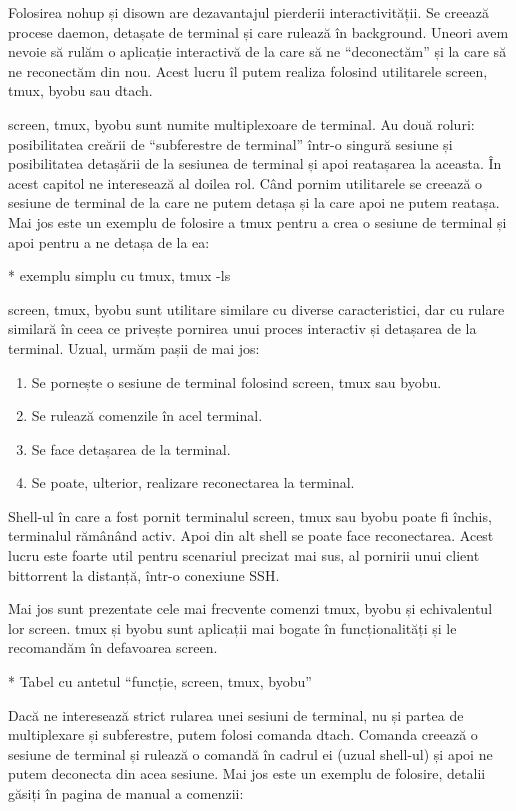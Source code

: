 Folosirea nohup și disown are dezavantajul pierderii interactivității. Se
creează procese daemon, detașate de terminal și care rulează în background.
Uneori avem nevoie să rulăm o aplicație interactivă de la care să ne
“deconectăm” și la care să ne reconectăm din nou. Acest lucru îl putem realiza
folosind utilitarele screen, tmux, byobu sau dtach.

screen, tmux, byobu sunt numite multiplexoare de terminal. Au două roluri:
posibilitatea creării de “subferestre de terminal” într-o singură sesiune și
posibilitatea detașării de la sesiunea de terminal și apoi reatașarea la
aceasta. În acest capitol ne interesează al doilea rol. Când pornim utilitarele
se creează o sesiune de terminal de la care ne putem detașa și la care apoi ne
putem reatașa. Mai jos este un exemplu de folosire a tmux pentru a crea o
sesiune de terminal și apoi pentru a ne detașa de la ea:

* exemplu simplu cu tmux, tmux -ls

screen, tmux, byobu sunt utilitare similare cu diverse caracteristici, dar cu
rulare similară în ceea ce privește pornirea unui proces interactiv și detașarea
de la terminal. Uzual, urmăm pașii de mai jos:

\begin{enumerate}
	\item Se pornește o sesiune de terminal folosind screen, tmux sau byobu.
	\item Se rulează comenzile în acel terminal.
	\item Se face detașarea de la terminal.
	\item Se poate, ulterior, realizare reconectarea la terminal.
\end{enumerate}

Shell-ul în care a fost pornit terminalul screen, tmux sau byobu poate fi
închis, terminalul rămânând activ. Apoi din alt shell se poate face
reconectarea. Acest lucru este foarte util pentru scenariul precizat mai sus, al
pornirii unui client bittorrent la distanță, într-o conexiune SSH.

Mai jos sunt prezentate cele mai frecvente comenzi tmux, byobu și echivalentul
lor screen. tmux și byobu sunt aplicații mai bogate în funcționalități și le
recomandăm în defavoarea screen.

* Tabel cu antetul “funcție, screen, tmux, byobu”

Dacă ne interesează strict rularea unei sesiuni de terminal, nu și partea de
multiplexare și subferestre, putem folosi comanda dtach. Comanda creează o
sesiune de terminal și rulează o comandă în cadrul ei (uzual shell-ul) și apoi
ne putem deconecta din acea sesiune. Mai jos este un exemplu de folosire,
detalii găsiți în pagina de manual a comenzii:

